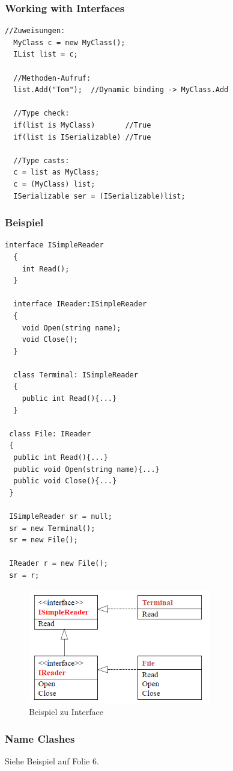 \subsubsection{Working with Interfaces}
\begin{lstlisting}[style=C]
  //Zuweisungen: 
  MyClass c = new MyClass(); 
  IList list = c; 
  
  //Methoden-Aufruf:
  list.Add("Tom");  //Dynamic binding -> MyClass.Add
  
  //Type check:
  if(list is MyClass)       //True
  if(list is ISerializable) //True
  
  //Type casts: 
  c = list as MyClass; 
  c = (MyClass) list; 
  ISerializable ser = (ISerializable)list;
\end{lstlisting}

\subsubsection{Beispiel}
\begin{lstlisting}[style=C]
  interface ISimpleReader
  {
    int Read();  
  }
  
  interface IReader:ISimpleReader
  {
    void Open(string name); 
    void Close(); 
  }
  
  class Terminal: ISimpleReader
  {
    public int Read(){...}
  }
 
 class File: IReader
 {
  public int Read(){...}
  public void Open(string name){...}
  public void Close(){...}
 }
 
 ISimpleReader sr = null; 
 sr = new Terminal(); 
 sr = new File(); 
 
 IReader r = new File(); 
 sr = r; 
\end{lstlisting}
\begin{figure}[h]
  \centering
  \includegraphics[height=5cm, ]{images/CSharp/InterfaceExample}
  \caption{Beispiel zu Interface} 
\end{figure}

\subsubsection{Name Clashes}
Siehe Beispiel auf Folie 6. 